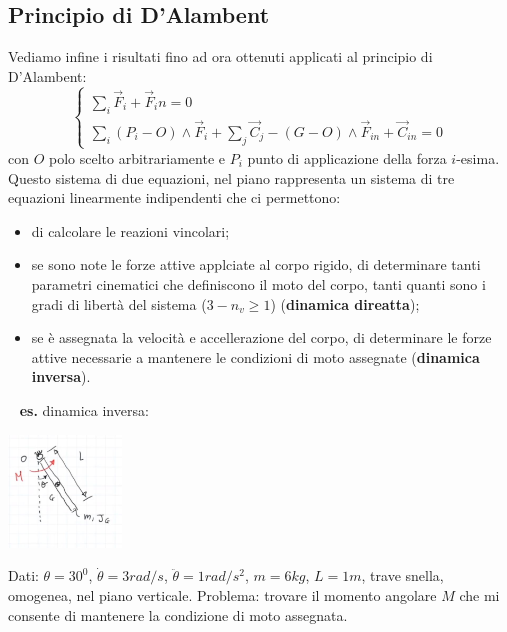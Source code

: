 \subsection*{Principio di D'Alambent}
Vediamo infine i risultati fino ad ora ottenuti applicati al principio di D'Alambent:
\[
    \begin{cases}
        \sum_i \vec{F}_i + \vec{F}_in = 0\\
        \sum_i (P_i - O) \land \vec{F}_i + \sum_j \vec{C}_j - (G-O) \land \vec{F}_{in} + \vec{C}_{in} = 0
    \end{cases}
\]
con $O$ polo scelto arbitrariamente e $P_i$ punto di applicazione della forza $i$-esima.\newline
\newline
Questo sistema di due equazioni, nel piano rappresenta un sistema di tre equazioni linearmente indipendenti che ci permettono:
\begin{itemize}
    \item di calcolare le reazioni vincolari;
    \item se sono note le forze attive applciate al corpo rigido, di determinare tanti parametri cinematici che definiscono il moto del corpo, tanti quanti sono i gradi di libertà del sistema ($3-n_v \geq 1$) (\textbf{dinamica direatta});
    \item se è assegnata la velocità e accellerazione del corpo, di determinare le forze attive necessarie a mantenere le condizioni di moto assegnate (\textbf{dinamica inversa}).
\end{itemize}
\ \newline
\newline
\textbf{es.} dinamica inversa:
\begin{center}
    \includegraphics[height=3cm]{../lezione9/img4.JPG}
\end{center}
Dati: $\theta = 30^0$, $\dot{\theta} = 3 rad/s$, $\ddot{\theta} = 1 rad/s^2$, $m = 6 kg$, $L = 1m$, trave snella, omogenea, nel piano verticale.\newline
Problema: trovare il momento angolare $M$ che mi consente di mantenere la condizione di moto assegnata.\newline
